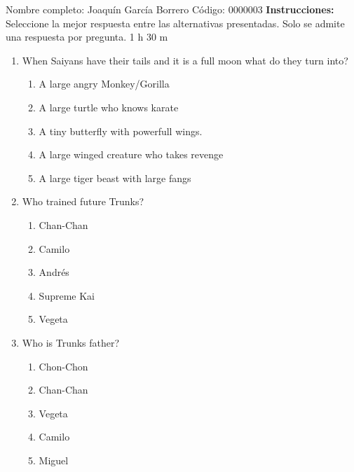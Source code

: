 \documentclass[letterpaper,addpoints,answers,twocolumn,10pt]{exam}
\begin{document}
\noindent Nombre completo: Joaquín García Borrero
\newline \newline \newline \newline
Código: 0000003\newline \newline 
{\bf Instrucciones:} Seleccione la mejor respuesta entre las alternativas presentadas. Solo se admite una respuesta por pregunta.
 1 h 30 m

\begin{enumerate}[leftmargin=.2in]




\item  When Saiyans have their tails and it is a full moon what do they turn into?


\begin{enumerate}[noitemsep,leftmargin=0in]


\item  A large angry Monkey/Gorilla
\item  A large turtle who knows karate
\item  A tiny butterfly with powerfull wings.
\item  A large winged creature who takes revenge
\item  A large tiger beast with large fangs


\end{enumerate}



\item  Who trained future Trunks?


\begin{enumerate}[noitemsep,leftmargin=0in]


\item  Chan-Chan
\item  Camilo
\item  Andrés
\item  Supreme Kai
\item  Vegeta


\end{enumerate}



\item  Who is Trunks father?


\begin{enumerate}[noitemsep,leftmargin=0in]


\item  Chon-Chon
\item  Chan-Chan
\item  Vegeta
\item  Camilo
\item  Miguel



\end{enumerate}
\end{enumerate}
\end{document}
